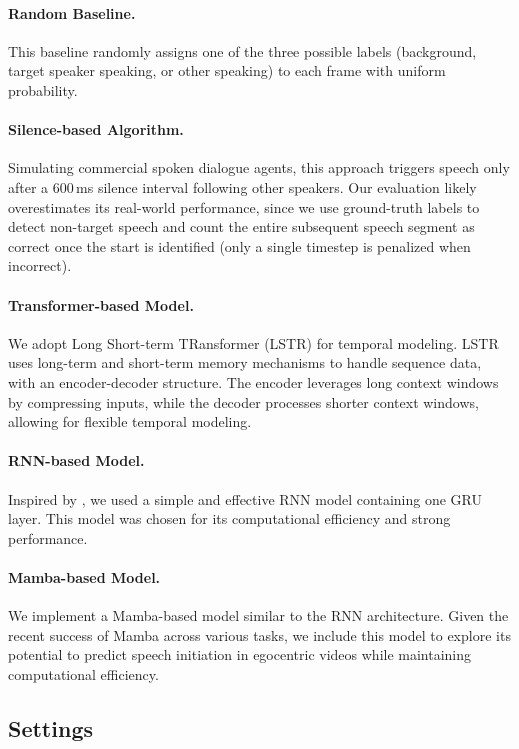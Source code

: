 \paragraph{Random Baseline.}
This baseline randomly assigns one of the three possible labels (background, target speaker speaking, or other speaking) to each frame with uniform probability.

\paragraph{Silence-based Algorithm.}
Simulating commercial spoken dialogue agents, this approach triggers speech only after a 600\,ms silence interval following other speakers. Our evaluation likely overestimates its real-world performance, since we use ground-truth labels to detect non-target speech and count the entire subsequent speech segment as correct once the start is identified (only a single timestep is penalized when incorrect).

\paragraph{Transformer-based Model.}
We adopt Long Short-term TRansformer (LSTR) \cite{xu2021longlstr} for temporal modeling. LSTR uses long-term and short-term memory mechanisms to handle sequence data, with an encoder-decoder structure. The encoder leverages long context windows by compressing inputs, while the decoder processes shorter context windows, allowing for flexible temporal modeling.


\paragraph{RNN-based Model.}
Inspired by \citet{an2023miniroad}, we used a simple and effective RNN model containing one GRU layer. This model was chosen for its computational efficiency and strong performance. 

\paragraph{Mamba-based Model.}
We implement a Mamba-based model \cite{gu2023mamba} similar to the RNN architecture. Given the recent success of Mamba across various tasks, we include this model to explore its potential to predict speech initiation in egocentric videos while maintaining computational efficiency.


\subsection{Settings}
